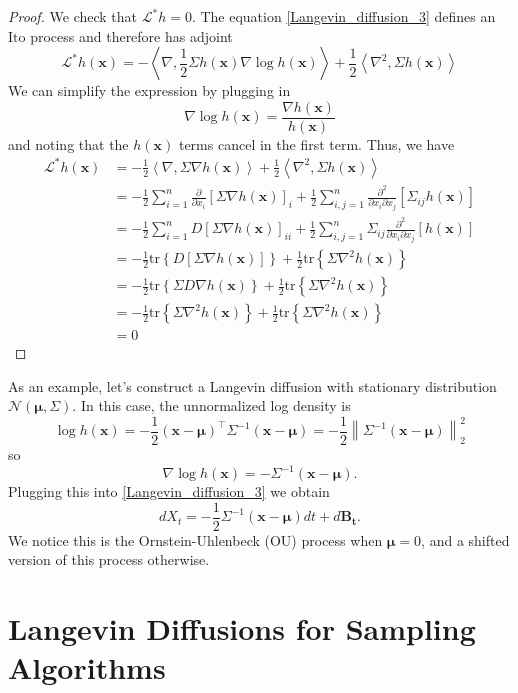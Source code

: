 \documentclass[12pt]{article}
\newcommand{\B}[1]{\boldsymbol{#1}}
\newcommand{\Gaussian}{\mathcal{N}}
\newcommand*{\norm}[1]{\left\lVert#1\right\rVert}
\newcommand{\bx}{\mathbf{x}}
\newcommand{\state}[1][t]{X_{#1}}
\newcommand{\BM}[1][t]{B_{#1}} %
\newcommand{\gen}{\mathcal{L}} %
\newcommand{\ito}{\text{It}\hat{\text{o}}}
\newcommand{\dimState}{n}
\newcommand{\invariantDens}{h} %
\begin{document}
\begin{proof}
We check that $\gen^* \invariantDens = 0$. The equation \ref{Langevin_diffusion_3} defines an $\ito$ process and therefore has adjoint
\[
\gen^* \invariantDens(\bx) = -\left\langle \nabla, \frac{1}{2} \Sigma \invariantDens(\bx) \nabla \log \invariantDens(\bx) \right\rangle + \frac{1}{2} \left\langle \nabla^2, \Sigma \invariantDens(\bx)\right\rangle
\]
We can simplify the expression by plugging in 
\[
\nabla \log \invariantDens(\bx) = \frac{\nabla \invariantDens(\bx)}{\invariantDens(\bx)}
\]
and noting that the $\invariantDens(\bx)$ terms cancel in the first term. Thus, we have 
\begin{align*}
\gen^* \invariantDens(\bx) 
&= -\frac{1}{2}  \left\langle \nabla, \Sigma \nabla \invariantDens(\bx) \right\rangle + \frac{1}{2} \left\langle \nabla^2, \Sigma \invariantDens(\bx)\right\rangle \\
&= -\frac{1}{2} \sum_{i=1}^{\dimState} \frac{\partial}{\partial x_i} \left[\Sigma \nabla \invariantDens(\bx) \right]_i + \frac{1}{2} \sum_{i,j=1}^{\dimState} \frac{\partial^2}{\partial x_i \partial x_j} \left[\Sigma_{ij} \invariantDens(\bx) \right] \\
&= -\frac{1}{2} \sum_{i=1}^{\dimState} D\left[\Sigma \nabla \invariantDens(\bx) \right]_{ii} + \frac{1}{2} \sum_{i,j=1}^{\dimState} \Sigma_{ij}  \frac{\partial^2}{\partial x_i \partial x_j} \left[\invariantDens(\bx) \right] \\
&= -\frac{1}{2} \text{tr}\left\{D\left[\Sigma \nabla \invariantDens(\bx) \right] \right\} + \frac{1}{2} \text{tr}\left\{\Sigma \nabla^2 \invariantDens(\bx) \right\} \\
&= -\frac{1}{2} \text{tr}\left\{\Sigma D \nabla \invariantDens(\bx) \right\} + \frac{1}{2} \text{tr}\left\{\Sigma \nabla^2 \invariantDens(\bx) \right\} \\
&= -\frac{1}{2} \text{tr}\left\{\Sigma \nabla^2 \invariantDens(\bx) \right\} + \frac{1}{2} \text{tr}\left\{\Sigma \nabla^2 \invariantDens(\bx) \right\} \\
&= 0
\end{align*}
\end{proof}

As an example, let's construct a Langevin diffusion with stationary distribution $\Gaussian(\B\mu, \Sigma)$. In this case, the unnormalized log density is 
\[
\log \invariantDens(\bx) = -\frac{1}{2} (\bx - \B\mu)^\top \Sigma^{-1}(\bx - \B\mu) = -\frac{1}{2} \norm{\Sigma^{-1}(\bx - \B\mu)}^2_2
\]
so 
\[
\nabla \log \invariantDens(\bx) = -\Sigma^{-1} (\bx - \B\mu). 
\]
Plugging this into \ref{Langevin_diffusion_3} we obtain 
\[
d\state = -\frac{1}{2} \Sigma^{-1} (\bx - \B\mu) dt + d\B\BM.
\]
We notice this is the Ornstein-Uhlenbeck (OU) process when $\B\mu = 0$, and a shifted version of this process otherwise. 

\section{Langevin Diffusions for Sampling Algorithms}
\end{document}
